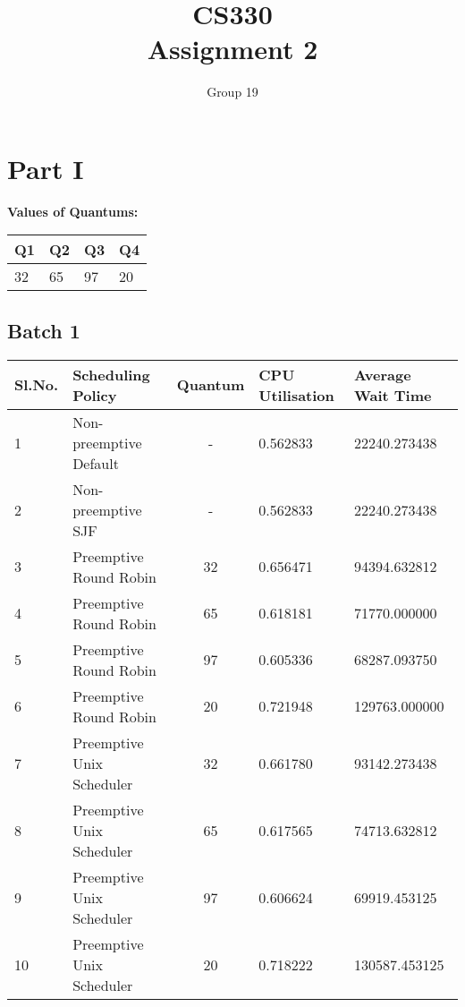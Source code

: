 \documentclass{article}
\author{Group 19}
\title{CS330 \\ Assignment 2}
\date{}
\begin{document}
\maketitle
\section{Part I}
\textbf{Values of Quantums:}\\

    \begin{tabular}{| l | l | l | l |}
    \hline
    Q1 & Q2 & Q3 & Q4 \\ \hline
    32 & 65 & 97 & 20 \\
    \hline
    \end{tabular}


\subsection{Batch 1}
    \begin{center}
    \begin{tabular}{| l | l | c | l | l |}
    \hline
    Sl.No. & Scheduling Policy & Quantum & CPU Utilisation & Average Wait Time \\ \hline
    1 & Non-preemptive Default & - & 0.562833 & 22240.273438 \\
    2 & Non-preemptive SJF  & - & 0.562833 & 22240.273438 \\
    3 & Preemptive Round Robin & 32 & 0.656471 & 94394.632812 \\
    4 & Preemptive Round Robin & 65 & 0.618181 & 71770.000000 \\
    5 & Preemptive Round Robin & 97 & 0.605336 & 68287.093750 \\
    6 & Preemptive Round Robin & 20 & 0.721948 & 129763.000000 \\
    7 & Preemptive Unix Scheduler & 32 & 0.661780 & 93142.273438 \\
    8 & Preemptive Unix Scheduler & 65 & 0.617565 & 74713.632812 \\
    9 & Preemptive Unix Scheduler & 97 & 0.606624 & 69919.453125 \\
    10 & Preemptive Unix Scheduler & 20 & 0.718222 & 130587.453125 \\
    \hline
    \end{tabular}
    \end{center}
\end{document}
